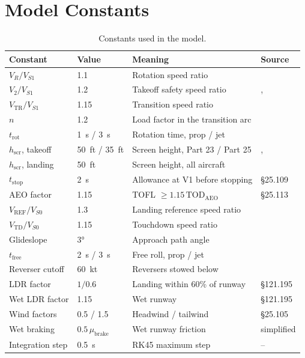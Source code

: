 \documentclass[11pt,letterpaper]{article}
\numberwithin{equation}{section}
\begin{document}
\appendix
\section{Model Constants}
\begin{table}[H]
\centering
\small
\begin{tabular}{@{}llll@{}}
\toprule
\textbf{Constant} & \textbf{Value} & \textbf{Meaning} & \textbf{Source}\\
\midrule
$V_R / V_{S1}$ & 1.1 & Rotation speed ratio & \cite{RAYMER}\\
$V_2 / V_{S1}$ & 1.2 & Takeoff safety speed ratio & \cite{RAYMER}, \cite{14CFR25}\\
$V_\text{TR} / V_{S1}$ & 1.15 & Transition speed ratio & \cite{RAYMER}\\
$n$ & 1.2 & Load factor in the transition arc & \cite{RAYMER}\\
$t_\text{rot}$ & \SI{1}{s} / \SI{3}{s} & Rotation time, prop / jet & \cite{RAYMER}\\
$h_\text{scr}$, takeoff & \SI{50}{ft} / \SI{35}{ft} & Screen height, Part 23 / Part 25 & \cite{14CFR23}, \cite{14CFR25}\\
$h_\text{scr}$, landing & \SI{50}{ft} & Screen height, all aircraft & \cite{14CFR25}\\
$t_\text{stop}$ & \SI{2}{s} & Allowance at V1 before stopping & \cite{14CFR25} \S25.109\\
AEO factor & 1.15 & TOFL $\ge 1.15\,\text{TOD}_\text{AEO}$ & \cite{14CFR25} \S25.113\\
$V_\text{REF} / V_{S0}$ & 1.3 & Landing reference speed ratio & \cite{RAYMER}\\
$V_\text{TD} / V_{S0}$ & 1.15 & Touchdown speed ratio & \cite{RAYMER}\\
Glideslope & \ang{3} & Approach path angle & \cite{AIRBUS-GTG}\\
$t_\text{free}$ & \SI{2}{s} / \SI{3}{s} & Free roll, prop / jet & \cite{RAYMER}\\
Reverser cutoff & \SI{60}{kt} & Reversers stowed below & \cite{AIRBUS-GTG}\\
LDR factor & $1/0.6$ & Landing within 60\% of runway & \cite{14CFR121} \S121.195\\
Wet LDR factor & 1.15 & Wet runway & \cite{14CFR121} \S121.195\\
Wind factors & 0.5 / 1.5 & Headwind / tailwind & \cite{14CFR25} \S25.105\\
Wet braking & $0.5\,\mu_\text{brake}$ & Wet runway friction & simplified\\
Integration step & \SI{0.5}{s} & RK45 maximum step & --\\
\bottomrule
\end{tabular}
\caption{Constants used in the model.}\label{tab:constants}
\end{table}
\end{document}
